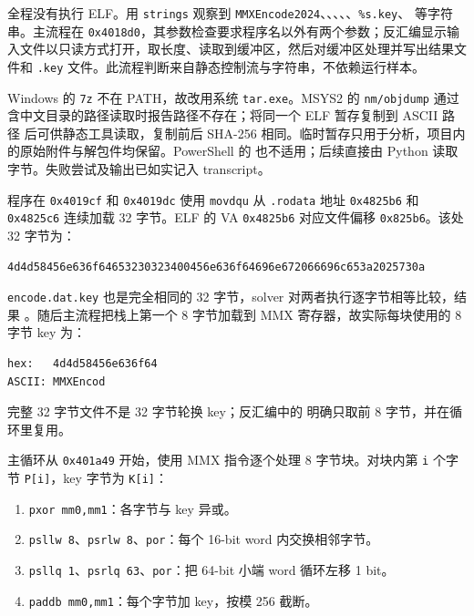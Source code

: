 全程没有执行 ELF。用 \texttt{strings} 观察到 \texttt{MMXEncode2024}、\texttt{}、\texttt{}、\texttt{}、\texttt{}、\texttt{\%s.key}、\texttt{} 等字符串。主流程在 \texttt{0x4018d0}，其参数检查要求程序名以外有两个参数；反汇编显示输入文件以只读方式打开，取长度、读取到缓冲区，然后对缓冲区处理并写出结果文件和 \texttt{.key} 文件。此流程判断来自静态控制流与字符串，不依赖运行样本。

Windows 的 \texttt{7z} 不在 PATH，故改用系统 \texttt{tar.exe}。MSYS2 的 \texttt{nm/objdump} 通过含中文目录的路径读取时报告路径不存在；将同一个 ELF 暂存复制到 ASCII 路径 \texttt{} 后可供静态工具读取，复制前后 SHA-256 相同。临时暂存只用于分析，项目内的原始附件与解包件均保留。PowerShell 的 \texttt{} 也不适用；后续直接由 Python \texttt{} 读取字节。失败尝试及输出已如实记入 transcript。

程序在 \texttt{0x4019cf} 和 \texttt{0x4019dc} 使用 \texttt{movdqu} 从 \texttt{.rodata} 地址 \texttt{0x4825b6} 和 \texttt{0x4825c6} 连续加载 32 字节。ELF 的 VA \texttt{0x4825b6} 对应文件偏移 \texttt{0x825b6}。该处 32 字节为：

\begin{verbatim}
4d4d58456e636f64653230323400456e636f64696e672066696c653a2025730a
\end{verbatim}

\texttt{encode.dat.key} 也是完全相同的 32 字节，solver 对两者执行逐字节相等比较，结果 \texttt{}。随后主流程把栈上第一个 8 字节加载到 MMX 寄存器，故实际每块使用的 8 字节 key 为：

\begin{verbatim}
hex:   4d4d58456e636f64
ASCII: MMXEncod
\end{verbatim}

完整 32 字节文件不是 32 字节轮换 key；反汇编中的 \texttt{} 明确只取前 8 字节，并在循环里复用。

主循环从 \texttt{0x401a49} 开始，使用 MMX 指令逐个处理 8 字节块。对块内第 \texttt{i} 个字节 \texttt{P{[}i{]}}，key 字节为 \texttt{K{[}i{]}}：

\begin{enumerate}
\def\labelenumi{\arabic{enumi}.}
\tightlist
\item
  \texttt{pxor\ mm0,mm1}：各字节与 key 异或。
\item
  \texttt{psllw\ 8}、\texttt{psrlw\ 8}、\texttt{por}：每个 16-bit word 内交换相邻字节。
\item
  \texttt{psllq\ 1}、\texttt{psrlq\ 63}、\texttt{por}：把 64-bit 小端 word 循环左移 1 bit。
\item
  \texttt{paddb\ mm0,mm1}：每个字节加 key，按模 256 截断。
\end{enumerate}

